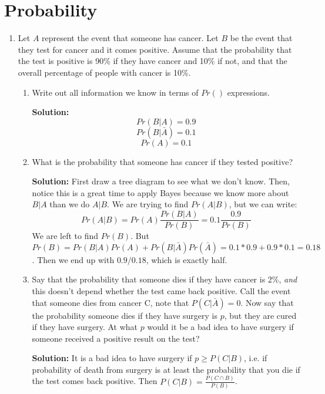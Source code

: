 \documentclass{article}
\newenvironment{solution}{

            \color{blue} \smallskip \textbf{Solution:}}{}
\begin{document}
    \section{Probability}
    \begin{enumerate}
        \item Let $A$ represent the event that someone has cancer. Let $B$ be the event that they test for cancer and it comes positive. Assume that the probability that the test is positive is 90\% if they
        have cancer and 10\% if not, and that the overall percentage of people with cancer is 10\%.
        \begin{enumerate}
            \item Write out all information we know in terms of $Pr()$ expressions.
            \begin{solution}
                \[
                    Pr(B|A) = 0.9
                \]
                \[
                    Pr(B|\bar{A}) = 0.1
                \]
                \[
                    Pr(A) = 0.1
                \]    
            \end{solution}
            \item What is the probability that someone has cancer if they tested positive?
            \begin{solution}
                First draw a tree diagram to see what we don't know.
                Then, notice this is a great time to apply Bayes because we know more about $B|A$ than we do
                $A|B$. We are trying to find $Pr(A|B)$, but we can write:
                \[
                    Pr(A|B) = Pr(A) \frac{Pr(B|A)}{Pr(B)} = 0.1 \frac{0.9}{Pr(B)}
                \]
                We are left to find $Pr(B)$. But $Pr(B) = Pr(B|A) Pr(A) + Pr(B|\bar{A}) Pr(\bar{A}) = 0.1 * 0.9 + 0.9 * 0.1 = 0.18$.
                Then we end up with $0.9/0.18$, which is exactly half.
            \end{solution}
            \item Say that the probability that someone dies if they have cancer is 2\%, \textit{and} this doesn't depend whether the test came back positive.
            Call the event that someone dies from cancer C, note that $P(C|\bar{A}) = 0$. Now say that the probability someone dies if they have surgery
            is $p$, but they are cured if they have surgery. At what $p$ would it be a bad idea to have surgery if someone received a positive result on the test?
            \begin{solution}
                It is a bad idea to have surgery if $p \geq P(C|B)$, i.e. if probability of death from surgery is at least the probability that you die if the test comes back positive.
                Then $P(C|B) = \frac{P(C \cap B)}{P(B)}$.


\end{solution}
\end{enumerate}
\end{enumerate}
\end{document}
